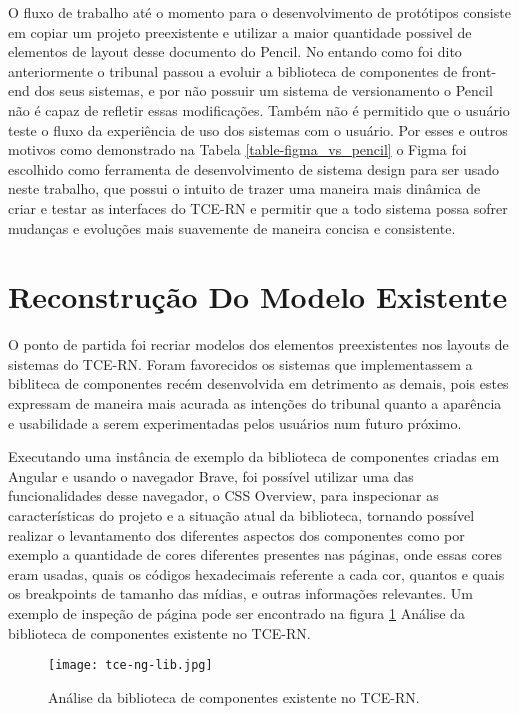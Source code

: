   O fluxo de trabalho até o momento para o desenvolvimento de protótipos consiste em copiar um projeto preexistente e utilizar a maior quantidade possivel de elementos de layout desse documento do Pencil. No entando como foi dito anteriormente o tribunal passou a evoluir a biblioteca de componentes de front-end dos seus sistemas, e por não possuir um sistema de versionamento o Pencil não é capaz de refletir essas modificações. Também não é permitido que o usuário teste o fluxo da experiência de uso dos sistemas com o usuário. Por esses e outros motivos como demonstrado na Tabela \ref{table-figma_vs_pencil} o Figma foi escolhido como ferramenta de desenvolvimento de sistema design para ser usado neste trabalho, que possui o intuito de trazer uma maneira mais dinâmica de criar e testar as interfaces do TCE-RN e permitir que a todo sistema possa sofrer mudanças e evoluções mais suavemente de maneira concisa e consistente.

\section{Reconstrução Do Modelo Existente} \label{secao32}

  O ponto de partida foi recriar modelos dos elementos preexistentes nos layouts de sistemas do TCE-RN. Foram favorecidos os sistemas que implementassem a bibliteca de componentes recém desenvolvida em detrimento as demais, pois estes expressam de maneira mais acurada as intenções do tribunal quanto a aparência e usabilidade a serem experimentadas pelos usuários num futuro próximo.

  Executando uma instância de exemplo da biblioteca de componentes criadas em Angular e usando o navegador Brave, foi possível utilizar uma das funcionalidades desse navegador, o CSS Overview, para inspecionar as características do projeto e a situação atual da biblioteca, tornando possível realizar o levantamento dos diferentes aspectos dos componentes como por exemplo a quantidade de cores diferentes presentes nas páginas, onde essas cores eram usadas, quais os códigos hexadecimais referente a cada cor, quantos e quais os breakpoints de tamanho das mídias, e outras informações relevantes. Um exemplo de inspeção de página pode ser encontrado na figura \ref{fig:tcenglib} Análise da biblioteca de componentes existente no TCE-RN.

  \begin{figure}[!h]
    \texttt{[image: tce-ng-lib.jpg]}
    \caption{Análise da biblioteca de componentes existente no TCE-RN.}
    \label{fig:tcenglib}
  \end{figure}

